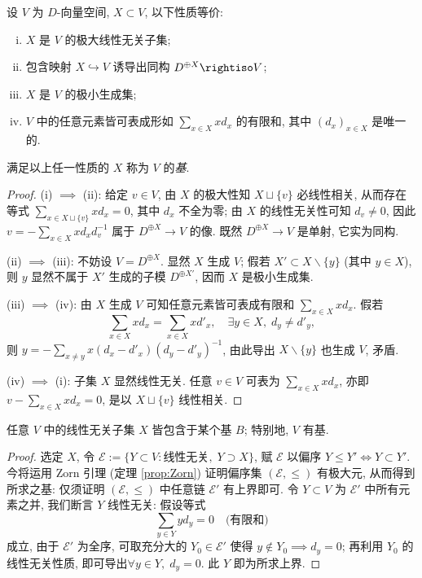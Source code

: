 \begin{definition-theorem}
	设 $V$ 为 $D$-向量空间, $X \subset V$, 以下性质等价:
	\begin{enumerate}[(i)]
		\item $X$ 是 $V$ 的极大线性无关子集;
		\item 包含映射 $X \hookrightarrow V$ 诱导出同构 $D^{\oplus X} \rightiso V$;
		\item $X$ 是 $V$ 的极小生成集;
		\item $V$ 中的任意元素皆可表成形如 $\sum_{x \in X} x d_x$ 的有限和, 其中 $(d_x)_{x \in X}$ 是唯一的.
	\end{enumerate}
	满足以上任一性质的 $X$ 称为 $V$ 的\emph{基}.
\end{definition-theorem}
\begin{proof}
	(i) $\implies$ (ii): 给定 $v \in V$, 由 $X$ 的极大性知 $X \sqcup \{v\}$ 必线性相关, 从而存在等式 $\sum_{x \in X \sqcup \{v\}} x d_x = 0$, 其中 $d_x$ 不全为零; 由 $X$ 的线性无关性可知 $d_v \neq 0$, 因此 $v = -\sum_{x \in X} x d_x d_v^{-1}$ 属于 $D^{\oplus X} \to V$ 的像. 既然 $D^{\oplus X} \to V$ 是单射, 它实为同构.

	(ii) $\implies$ (iii): 不妨设 $V = D^{\oplus X}$. 显然 $X$ 生成 $V$; 假若 $X' \subset X \smallsetminus \{y\}$ (其中 $y \in X$), 则 $y$ 显然不属于 $X'$ 生成的子模 $D^{\oplus X'}$, 因而 $X$ 是极小生成集.

	(iii) $\implies$ (iv): 由 $X$ 生成 $V$ 可知任意元素皆可表成有限和 $\sum_{x \in X} x d_x$. 假若
	\[ \sum_{x \in X} x d_x = \sum_{x \in X} x d'_x, \quad \exists y \in X, \; d_y \neq d'_y, \]
	则 $y = -\sum_{x \neq y} x (d_x - d'_x)(d_y - d'_y)^{-1}$, 由此导出 $X \smallsetminus \{y\}$ 也生成 $V$, 矛盾.

	(iv) $\implies$ (i): 子集 $X$ 显然线性无关. 任意 $v \in V$ 可表为 $\sum_{x \in X} x d_x$, 亦即 $v - \sum_{x \in X} x d_x = 0$, 是以 $X \sqcup \{v\}$ 线性相关.
\end{proof}

\begin{proposition}\label{prop:existence-basis}
	任意 $V$ 中的线性无关子集 $X$ 皆包含于某个基 $B$; 特别地, $V$ 有基.
\end{proposition}
\begin{proof}
	选定 $X$, 令 $\mathcal{E} := \{Y \subset V: \text{线性无关}, \; Y \supset X  \}$, 赋 $\mathcal{E}$ 以偏序 $Y \leq Y' \iff Y \subset Y'$. 今将运用 Zorn 引理 (定理 \ref{prop:Zorn}) 证明偏序集 $(\mathcal{E}, \leq)$ 有极大元, 从而得到所求之基: 仅须证明 $(\mathcal{E}, \leq)$ 中任意链 $\mathcal{E}'$ 有上界即可. 令 $Y \subset V$ 为 $\mathcal{E}'$ 中所有元素之并, 我们断言 $Y$ 线性无关: 假设等式
	\[ \sum_{y \in Y} y d_y = 0 \quad \text{(有限和)} \]
	成立, 由于 $\mathcal{E}'$ 为全序, 可取充分大的 $Y_0 \in \mathcal{E}'$ 使得 $y \notin Y_0 \implies d_y = 0$; 再利用 $Y_0$ 的线性无关性质, 即可导出$\forall y \in Y, \; d_y = 0$. 此 $Y$ 即为所求上界.
\end{proof}

